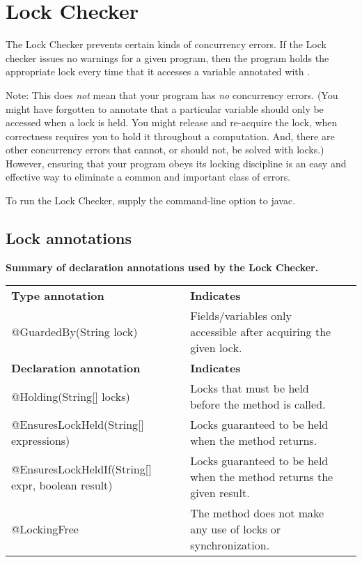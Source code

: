 \htmlhr
\chapter{Lock Checker\label{lock-checker}}

The Lock Checker prevents certain kinds of concurrency errors.  If the Lock
checker issues no warnings for a given program, then the program holds the
appropriate lock every time that it accesses a variable annotated with
.

Note:  This does \emph{not} mean that your program has \emph{no} concurrency
errors.  (You might have forgotten to annotate that a particular variable
should only be accessed when a lock is held.  You might release and
re-acquire the lock, when correctness requires you to hold it throughout a
computation.  And, there are other concurrency errors that cannot, or
should not, be solved with locks.)  However, ensuring that your
program obeys its locking discipline is an easy and effective way to
eliminate a common and important class of errors.


To run the Lock Checker, supply the
command-line option to javac.


\section{Lock annotations\label{lock-annotations}}

\textbf{Summary of declaration annotations used by the Lock Checker.}\\

\begin{tabular}{l|l|l}
\textbf{Type annotation} & \textbf{Indicates} \\
@GuardedBy(String lock) &
Fields/variables only accessible after acquiring the given lock.
\\
\textbf{Declaration annotation} & \textbf{Indicates} \\
@Holding(String[] locks) &
Locks that must be held before the method is called.
\\
@EnsuresLockHeld(String[] expressions) &
Locks guaranteed to be held when the method returns.
\\
@EnsuresLockHeldIf(String[] expr, boolean result) &
Locks guaranteed to be held when the method returns the given result.
\\
@LockingFree &
The method does not make any use of locks or synchronization.
\\
\end{tabular}

